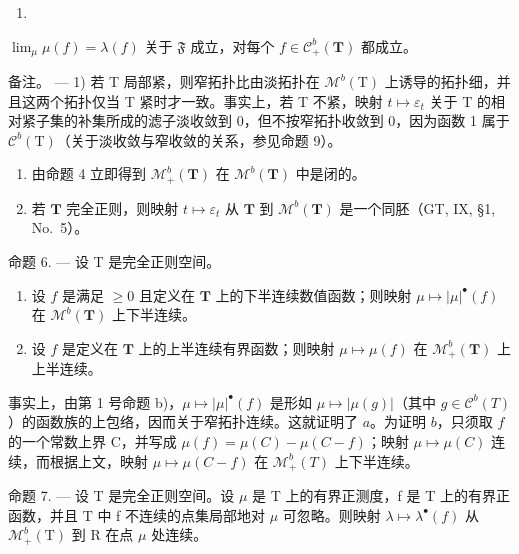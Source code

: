 \begin{enumerate}
\def\labelenumi{(\arabic{enumi})}
\setcounter{enumi}{3}
\tightlist
\item
\end{enumerate}

\(\lim_{\mu} \mu(f) = \lambda(f)\) 关于 \(\mathfrak{F}\) 成立，对每个 \(f \in \mathcal{C}_+^b(\mathbf{T})\) 都成立。

备注。 --- 1) 若 T 局部紧，则窄拓扑比由淡拓扑在 \(\mathcal{M}^{b}(\mathrm{T})\) 上诱导的拓扑细，并且这两个拓扑仅当 T 紧时才一致。事实上，若 T 不紧，映射 \(t \mapsto \varepsilon_{t}\) 关于 T 的相对紧子集的补集所成的滤子淡收敛到 0，但不按窄拓扑收敛到 0，因为函数 1 属于 \(\mathcal{C}^{b}(\mathrm{T})\)（关于淡收敛与窄收敛的关系，参见命题 9）。

\begin{enumerate}
\def\labelenumi{\arabic{enumi})}
\setcounter{enumi}{1}
\item
  由命题 4 立即得到 \(\mathcal{M}_+^b (\mathbf{T})\) 在 \(\mathcal{M}^b (\mathbf{T})\) 中是闭的。
\item
  若 \(\mathbf{T}\) 完全正则，则映射 \(t \mapsto \varepsilon_t\) 从 \(\mathbf{T}\) 到 \(\mathcal{M}^b(\mathbf{T})\) 是一个同胚（GT, IX, §1, No.~5）。
\end{enumerate}

命题 6. --- 设 T 是完全正则空间。

\begin{enumerate}
\def\labelenumi{\alph{enumi})}
\item
  设 \(f\) 是满足 \(\geqslant 0\) 且定义在 \(\mathbf{T}\) 上的下半连续数值函数；则映射 \(\mu \mapsto |\mu|^{\bullet}(f)\) 在 \(\mathcal{M}^b(\mathbf{T})\) 上下半连续。
\item
  设 \(f\) 是定义在 \(\mathbf{T}\) 上的上半连续有界函数；则映射 \(\mu \mapsto \mu(f)\) 在 \(\mathcal{M}_+^b(\mathbf{T})\) 上上半连续。
\end{enumerate}

事实上，由第 1 号命题 b)，\(\mu \mapsto |\mu|^{\bullet}(f)\) 是形如 \(\mu \mapsto |\mu(g)|\)（其中 \(g \in \mathcal{C}^b(T)\)）的函数族的上包络，因而关于窄拓扑连续。这就证明了 \(a\)。为证明 \(b\)，只须取 \(f\) 的一个常数上界 C，并写成 \(\mu(f) = \mu(C) - \mu(C - f)\)；映射 \(\mu \mapsto \mu(C)\) 连续，而根据上文，映射 \(\mu \mapsto \mu(C - f)\) 在 \(\mathcal{M}_+^b(T)\) 上下半连续。

命题 7. --- 设 T 是完全正则空间。设 \(\mu\) 是 T 上的有界正测度，f 是 T 上的有界正函数，并且 T 中 f 不连续的点集局部地对 \(\mu\) 可忽略。则映射 \(\lambda \mapsto \lambda^{\bullet}(f)\) 从 \(\mathcal{M}_{+}^{b}(\mathrm{T})\) 到 R 在点 \(\mu\) 处连续。

